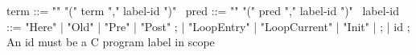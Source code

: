 \begin{syntax}
  term ::= "\at" "(" term "," label-id ")"
  \ 
  pred ::= "\at" "(" pred "," label-id ")" 
  \
  label-id ::= "Here" | "Old" | "Pre" | "Post" ;
             | "LoopEntry" | "LoopCurrent" | "Init" | ;
             | id ; An id must be a C program label in scope
\end{syntax}

